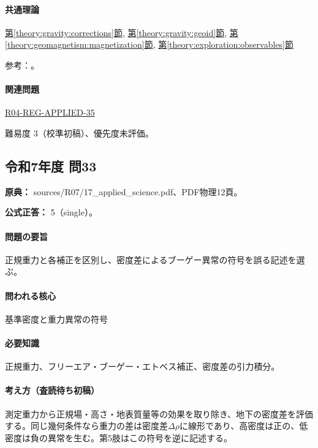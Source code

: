 \paragraph{共通理論} \hyperref[theory:gravity:corrections]{第\ref*{theory:gravity:corrections}節}, \hyperref[theory:gravity:geoid]{第\ref*{theory:gravity:geoid}節}, \hyperref[theory:geomagnetism:magnetization]{第\ref*{theory:geomagnetism:magnetization}節}, \hyperref[theory:exploration:observables]{第\ref*{theory:exploration:observables}節}

\par 参考：\cite{gsi_gravity_definitions,kanaya_okuma2011,sato_lei2009_ae}。

\paragraph{関連問題} \hyperref[q:r04-reg-applied-35]{R04-REG-APPLIED-35}

\par 難易度 3（校準初稿）、優先度未評価。

\subsection{令和7年度 問33}
\label{q:r07-reg-applied-33}

\noindent\textbf{原典：} sources/R07/17\_applied\_science.pdf、PDF物理12頁。

\textbf{公式正答：} 5（single）。

\paragraph{問題の要旨} 正規重力と各補正を区別し、密度差によるブーゲー異常の符号を誤る記述を選ぶ。

\paragraph{問われる核心} 基準密度と重力異常の符号

\paragraph{必要知識} 正規重力、フリーエア・ブーゲー・エトベス補正、密度差の引力積分。

\paragraph{考え方（査読待ち初稿）} 測定重力から正規場・高さ・地表質量等の効果を取り除き、地下の密度差を評価する。同じ幾何条件なら重力の差は密度差\(\Delta\rho\)に線形であり、高密度は正の、低密度は負の異常を生む。第5肢はこの符号を逆に記述する。

